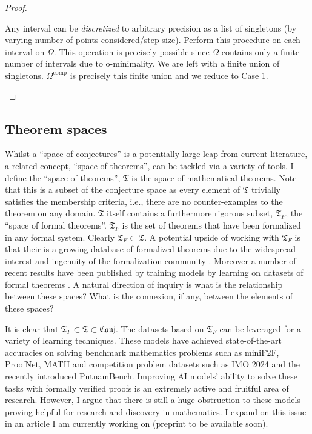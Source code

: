 \begin{definition}
\begin{proof}
\begin{itemize}
        Any interval can be \textit{discretized} to arbitrary precision as a list of singletons (by varying number of points considered/step size). Perform this procedure on each interval on $\Omega$. This operation is precisely possible since $\Omega$ contains only a finite number of intervals due to o-minimality. We are left with a finite union of singletons. $\Omega^\text{comp}$ is precisely this finite union and we reduce to Case 1.
    \end{itemize}
\end{proof}
\subsection{Theorem spaces}
Whilst a ``space of conjectures'' is a potentially large leap from current literature, a related concept, ``space of theorems'', can be tackled via a variety of tools.
I define the ``space of theorems'', $\mathfrak{T}$ is the space of mathematical theorems. Note that this is a subset of the conjecture space as every element of $\mathfrak{T}$ trivially satisfies the membership criteria, i.e.,
there are no counter-examples to the theorem on any domain.
$\mathfrak{T}$ itself contains a furthermore rigorous subset, $\mathfrak{T}_F$, the ``space of formal theorems''. $\mathfrak{T}_F$ is the set of theorems that have been formalized in any formal system. Clearly $\mathfrak{T}_F\subset\mathfrak{T}$. A potential upside of working with $\mathfrak{T}_F$ is that their is a growing database of formalized theorems due to the widespread interest and ingenuity of the formalization community \cite{formalization_examples}.
Moreover a number of recent results have been published by training models by learning on datasets of formal theorems \cite{Deepmind_stuff}. A natural direction of inquiry is what is the relationship between these spaces? What is the connexion, if any, between the elements of these spaces?
\\\par
It is clear that $\mathfrak{T}_F\subset\mathfrak{T}\subset\mathfrak{Conj}$. The datasets based on $\mathfrak{T}_F$ can be leveraged for a variety of learning techniques. These models have achieved state-of-the-art accuracies on solving benchmark mathematics problems such as miniF2F, ProofNet, MATH and competition problem datasets such as IMO 2024 and the recently introduced PutnamBench. Improving AI models' ability to solve these tasks with formally verified proofs
is an extremely active and fruitful area of research. However, I argue that there is still a huge obstruction to these models proving helpful for research and discovery in mathematics. I expand on this issue in an article I am currently working on (preprint to be available soon). 


\end{definition}
